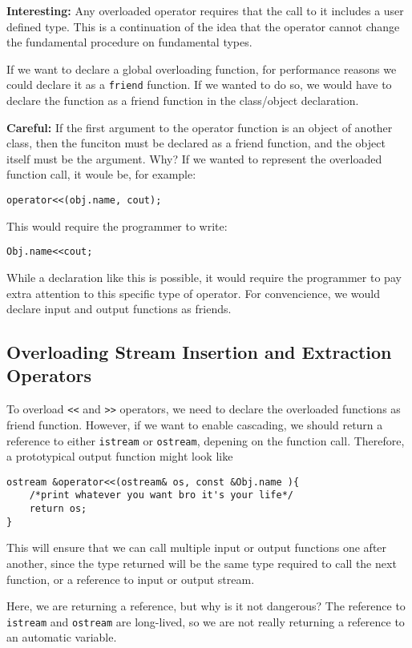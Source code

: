 \documentclass{article}
\begin{document}
\textbf{Interesting:} Any overloaded operator requires that the call to it includes a user defined type. This 
is a continuation of the idea that the operator cannot change the fundamental procedure on fundamental types.

If we want to declare a global overloading function, for performance reasons we could declare it as a 
\texttt{friend} function. If we wanted to do so, we would have to declare the function as a friend 
function in the class/object declaration.

\textbf{Careful:} If the first argument to the operator function is an object of another class, then the funciton
must be declared as a friend function, and the object itself must be the argument. Why? If we wanted to represent
the overloaded function call, it woule be, for example:
\begin{verbatim}
operator<<(obj.name, cout);
\end{verbatim}
This would require the programmer to write:
\begin{verbatim}
Obj.name<<cout;
\end{verbatim}
While a declaration like this is possible, it would require the programmer to pay extra attention to this 
specific type of operator. For convencience, we would declare input and output functions as friends.
\subsection{Overloading Stream Insertion and Extraction Operators}
To overload \texttt{<<} and \texttt{>>} operators, we need to declare the overloaded functions as friend function.
However, if we want to enable cascading, we should return a reference to either \texttt{istream} or 
\texttt{ostream}, depening on the function call. Therefore, a prototypical output function might look like 
\begin{verbatim}
ostream &operator<<(ostream& os, const &Obj.name ){
	/*print whatever you want bro it's your life*/
	return os;
}
\end{verbatim}
This will ensure that we can call multiple input or output functions one after another, since the type returned
will be the same type required to call the next function, or a reference to input or output stream.

Here, we are returning a reference, but why is it not dangerous? The reference to \texttt{istream} and 
\texttt{ostream} are long-lived, so we are not really returning a reference to an automatic variable.
\end{document}
